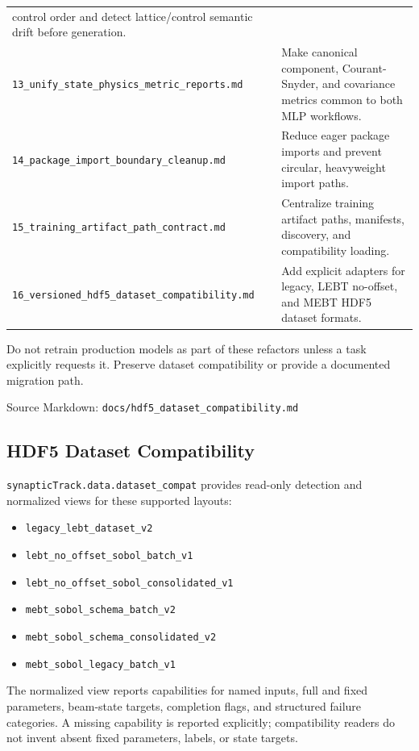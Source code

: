 \documentclass[
]{article}
\providecommand{\tightlist}{%
  \setlength{\itemsep}{0pt}\setlength{\parskip}{0pt}}
\begin{document}
\begin{longtable}[]{@{}
  >{\raggedright\arraybackslash}p{}
  >{\raggedright\arraybackslash}p{}@{}}
control order and detect lattice/control semantic drift before
generation. \\
\texttt{13\_unify\_state\_physics\_metric\_reports.md} & Make canonical
component, Courant-Snyder, and covariance metrics common to both MLP
workflows. \\
\texttt{14\_package\_import\_boundary\_cleanup.md} & Reduce eager
package imports and prevent circular, heavyweight import paths. \\
\texttt{15\_training\_artifact\_path\_contract.md} & Centralize training
artifact paths, manifests, discovery, and compatibility loading. \\
\texttt{16\_versioned\_hdf5\_dataset\_compatibility.md} & Add explicit
adapters for legacy, LEBT no-offset, and MEBT HDF5 dataset formats. \\
\end{longtable}

Do not retrain production models as part of these refactors unless a
task explicitly requests it. Preserve dataset compatibility or provide a
documented migration path.

Source Markdown: \texttt{docs/hdf5\_dataset\_compatibility.md}

\hypertarget{hdf5-dataset-compatibility}{%
\subsection{HDF5 Dataset
Compatibility}\label{hdf5-dataset-compatibility}}

\texttt{synapticTrack.data.dataset\_compat} provides read-only detection
and normalized views for these supported layouts:

\begin{itemize}
\tightlist
\item
  \texttt{legacy\_lebt\_dataset\_v2}
\item
  \texttt{lebt\_no\_offset\_sobol\_batch\_v1}
\item
  \texttt{lebt\_no\_offset\_sobol\_consolidated\_v1}
\item
  \texttt{mebt\_sobol\_schema\_batch\_v2}
\item
  \texttt{mebt\_sobol\_schema\_consolidated\_v2}
\item
  \texttt{mebt\_sobol\_legacy\_batch\_v1}
\end{itemize}

The normalized view reports capabilities for named inputs, full and
fixed parameters, beam-state targets, completion flags, and structured
failure categories. A missing capability is reported explicitly;
compatibility readers do not invent absent fixed parameters, labels, or
state targets.
\end{document}

